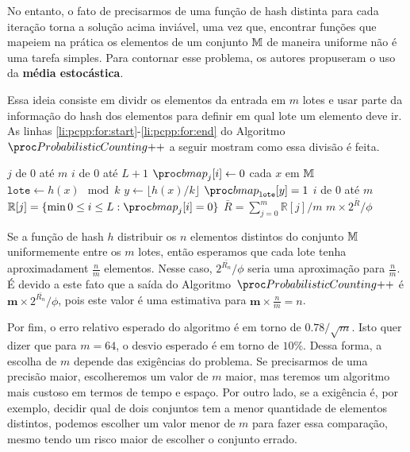 No entanto, o fato de precisarmos de uma função de hash distinta para cada iteração torna a solução acima inviável, uma 
vez que, encontrar funções que mapeiem na prática os elementos de um conjunto $\mathbb{M}$ de maneira uniforme não é uma 
tarefa simples. Para contornar esse problema, os autores propuseram o uso da \textbf{média estocástica}.

Essa ideia consiste em dividr os elementos da entrada em $m$ lotes e usar parte da informação do hash dos elementos para 
definir em qual lote um elemento deve ir. As linhas \ref{li:pcpp:for:start}-\ref{li:pcpp:for:end} do Algoritmo~$\pc{++}$ 
a seguir mostram como essa divisão é feita.

\begin{codebox}
  \li \For $j$ de $0$ até $m$
      \Do
  \li    \For $i$ de $0$ até $L + 1$
          \Do
  \li       $\bitmap_{j}[i] \gets 0$
          \End
      \End
  \li \For cada $x$ em $\mathbb{M}$                                               \label{li:pcpp:for:start}
      \Do
  \li   $\texttt{lote} \gets h(x) \mod k$
  \li   $y \gets \lfloor h(x) / k \rfloor$
  \li   $\bitmap_{\texttt{lote}}[y] = 1$                                             \label{li:pcpp:for:end}
      \End
  \li \For $i$ de $0$ até $m$
      \Do
  \li    $\mathbb{R}[j] = \{ \min 0 \leq i \leq L: \bitmap_{j}[i] = 0 \}$
      \End
  \li $\bar{R} = \sum_{j=0}^{m} \mathbb{R}[j] / m$
  \li \Return $m \times 2^{\bar{R}}/\phi$
  \End
\end{codebox}

Se a função de hash $h$ distribuir os $n$ elementos distintos do conjunto $\mathbb{M}$ uniformemente entre os $m$ lotes, então 
esperamos que cada lote tenha aproximadament $\frac{n}{m}$ elementos. Nesse caso, $2^{\bar{R_n}}/\phi$ seria uma 
aproximação para $\frac{n}{m}$. É devido a este fato que a saída do Algoritmo~$\pc{++}$ é 
$\mathbf{m} \times 2^{\bar{R_n}}/\phi$, pois este valor é uma estimativa para $\mathbf{m} \times \frac{n}{m} = n$.

Por fim, o erro relativo esperado do algoritmo \pcpp é em torno de $0.78 / \sqrt{m}$. Isto quer 
dizer que para $m = 64$, o desvio esperado é em torno de $10\%$. Dessa forma, a escolha de $m$ depende das exigências do 
problema. Se precisarmos de uma precisão maior, escolheremos um valor de $m$  maior, mas teremos um algoritmo mais 
custoso em termos de tempo e espaço. Por outro lado, se a exigência é, por exemplo, decidir qual de dois conjuntos tem a 
menor quantidade de elementos distintos, podemos escolher um valor menor de $m$ para fazer essa comparação, mesmo tendo 
um risco maior de escolher o conjunto errado.

